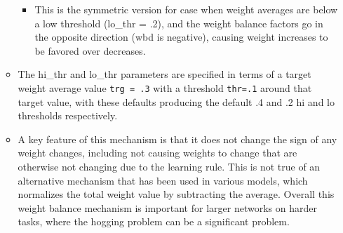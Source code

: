 \begin{itemize}
\begin{itemize}
    \begin{itemize}
    \tightlist
    \item
      This is the symmetric version for case when weight averages are
      below a low threshold (lo\_thr = .2), and the weight balance
      factors go in the opposite direction (wbd is negative), causing
      weight increases to be favored over decreases.
    \end{itemize}
  \item
    The hi\_thr and lo\_thr parameters are specified in terms of a
    target weight average value \texttt{trg\ =\ .3} with a threshold
    \texttt{thr=.1} around that target value, with these defaults
    producing the default .4 and .2 hi and lo thresholds respectively.
  \item
    A key feature of this mechanism is that it does not change the sign
    of any weight changes, including not causing weights to change that
    are otherwise not changing due to the learning rule. This is not
    true of an alternative mechanism that has been used in various
    models, which normalizes the total weight value by subtracting the
    average. Overall this weight balance mechanism is important for
    larger networks on harder tasks, where the hogging problem can be a
    significant problem.
  \end{itemize}
\end{itemize}


